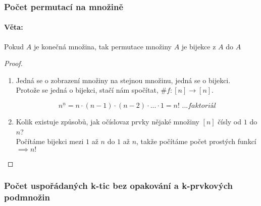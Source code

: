 \documentclass[10pt,a4paper]{article}
\begin{document}
\subsubsection{Počet permutací na množině}
\paragraph*{Věta: } Pokud $A$ je konečná množina, tak permutace množiny $A$ je bijekce z $A$ do $A$

\begin{proof}
    $ $
    \begin{enumerate}[label=(\alph*)]
        \item Jedná se o zobrazení množiny na stejnou množinu, jedná se o bijekci.\\
        Protože se jedná o bijekci, stačí nám spočítat, $\#f:[n] \to [n]$.

        \[
            n^{\underline{n}} = n\cdot(n-1)\cdot(n-2)\cdot ... \cdot 1 = n! \textit{ ...faktoriál}
        \]
        \item Kolik existuje způsobů, jak očíslovaz prvky nějaké množiny $[n]$ čísly od $1$ do $n$?\\
        Počítáme bijekci mezi $1$ až $n$ do $1$ až $n$, takže počítáme počet prostých funkcí $\implies n!$
    \end{enumerate}
\end{proof}


\subsubsection{Počet uspořádaných k-tic bez opakování a k-prvkových podmnožin}
\end{document}
